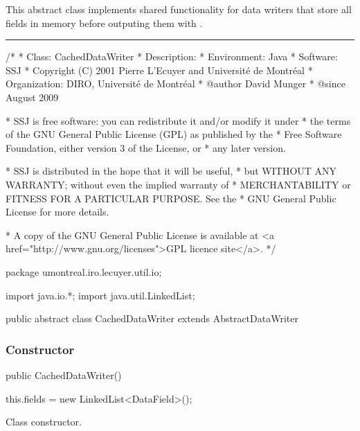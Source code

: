
This abstract class implements shared functionality for data writers that store
all fields in memory before outputing them with .

\bigskip\hrule

\begin{code}
\begin{hide}
/*
 * Class:        CachedDataWriter
 * Description:  
 * Environment:  Java
 * Software:     SSJ 
 * Copyright (C) 2001  Pierre L'Ecuyer and Université de Montréal
 * Organization: DIRO, Université de Montréal
 * @author       David Munger 
 * @since        August 2009

 * SSJ is free software: you can redistribute it and/or modify it under
 * the terms of the GNU General Public License (GPL) as published by the
 * Free Software Foundation, either version 3 of the License, or
 * any later version.

 * SSJ is distributed in the hope that it will be useful,
 * but WITHOUT ANY WARRANTY; without even the implied warranty of
 * MERCHANTABILITY or FITNESS FOR A PARTICULAR PURPOSE.  See the
 * GNU General Public License for more details.

 * A copy of the GNU General Public License is available at
   <a href="http://www.gnu.org/licenses">GPL licence site</a>.
 */
\end{hide}
package umontreal.iro.lecuyer.util.io;
\begin{hide}
import java.io.*;
import java.util.LinkedList;
\end{hide}

public abstract class CachedDataWriter extends AbstractDataWriter \begin{hide} {

   // don't use a map because ordering is important
   protected LinkedList<DataField> fields;

   protected LinkedList<DataField> getFields() {
      return fields;
   }
\end{hide}
\end{code}

\subsubsection*{Constructor}
\begin{code}

   public CachedDataWriter() \begin{hide} {
      this.fields = new LinkedList<DataField>();
   }
   \end{hide}
\end{code}
\begin{tabb}
Class constructor.
\end{tabb}
   
